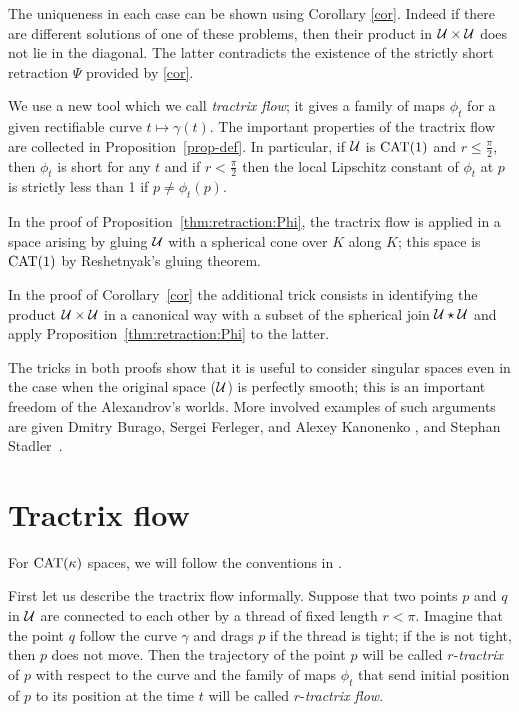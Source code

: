 \documentclass[oneside,a4paper, 12pt]{article}
\begin{document}
The uniqueness in each case can be shown using Corollary \ref{cor}.
Indeed if there are different solutions of one of these problems, then their product in ${\mathcal{U}}\times {\mathcal{U}}$ does not lie in the diagonal.
The latter contradicts the existence of the strictly short retraction $\Psi$ provided by \ref{cor}.

We use a new tool which we call \emph{tractrix flow}; it gives a family of maps $\phi_t$ for a given rectifiable curve $t\mapsto\gamma(t)$.
The important properties of the tractrix flow are collected in Proposition~\ref{prop-def}.
In particular, if $\mathcal{U}$ is $\mathrm{CAT}(1)$ and $r\le \tfrac\pi2$, then $\phi_t$ is short for any $t$ 
and if $r< \tfrac\pi2$ then the local Lipschitz constant of $\phi_t$ at $p$ is strictly less than 1 if $p\ne \phi_t(p)$.

In the proof of Proposition~\ref{thm:retraction:Phi}, the tractrix flow is applied in a space arising by gluing $\mathcal{U}$ with a spherical cone over $K$ along $K$;
this space is $\mathrm{CAT}(1)$ by Reshetnyak's gluing theorem.

In the proof of Corollary~\ref{cor} the additional trick consists in identifying the product $\mathcal{U}\times \mathcal{U}$ in a canonical way with a subset of the spherical join $\mathcal{U}\star \mathcal{U}$ and apply Proposition~\ref{thm:retraction:Phi} to the latter.

The tricks in both proofs show that it is useful to consider singular spaces even in the case when the original space ($\mathcal{U}$) is perfectly smooth;
this is an important freedom of the Alexandrov's worlds.
More involved examples of such arguments are given Dmitry Burago, Sergei Ferleger, and Alexey Kanonenko \cite{BFK}, and Stephan Stadler~\cite{stadler}.

\section{Tractrix flow}\label{sec:Tractrix flow}

For $\mathrm{CAT}(\kappa)$ spaces, we will follow the conventions in \cite{akp}.

First let us describe the tractrix flow informally.
Suppose that two points $p$ and $q$ in ${\mathcal{U}}$ are connected to each other by a thread of fixed length $r<\pi$.
Imagine that the point $q$ follow the curve $\gamma$ and drags $p$ if the thread is tight; 
if the is not tight, then $p$ does not move.
Then the trajectory of the point $p$ will be called $r$-\emph{tractrix} of $p$ with respect to the curve
and the family of maps $\phi_t$ that send initial position of $p$ to its position at the time $t$ will be called $r$-\emph{tractrix flow}.
\end{document}
